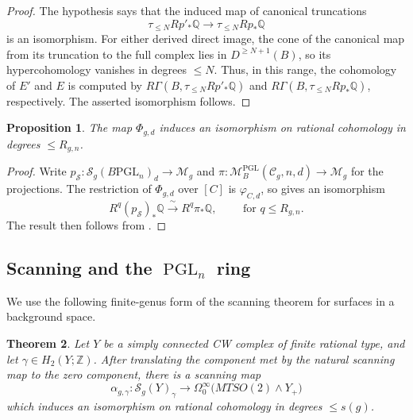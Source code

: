 \documentclass[11pt,reqno]{amsart}
\theoremstyle{plain} %
\newtheorem{theorem}{Theorem}[section]
\newtheorem{prop}[theorem]{Proposition}
\theoremstyle{definition}
\newcommand{\QQ}{\mathbb{Q}}
\newcommand{\M}{\mathcal{M}}
\newcommand{\C}{\mathcal{C}}
\newcommand{\ZZ}{\mathbb{Z}}
\DeclareMathOperator{\PGL}{PGL}
\newcommand{\BPGL}{B\mathrm{PGL}}
\newcommand{\Sc}{\mathcal{S}}
\begin{document}
\begin{proof}
The hypothesis says that the induced map of canonical truncations
\[
\tau_{\le N}Rp'_*\QQ \longrightarrow \tau_{\le N}Rp_*\QQ
\]
is an isomorphism. For either derived direct image, the cone of the canonical map from its truncation to the full complex lies in $D^{\geq N+1}(B)$, so its hypercohomology vanishes in degrees $\le N$. Thus, in this range, the cohomology of $E'$ and $E$ is computed by $R\Gamma(B,\tau_{\le N}Rp'_*\QQ)$ and $R\Gamma(B,\tau_{\le N}Rp_*\QQ)$, respectively. The asserted isomorphism follows.
\end{proof}

\begin{prop} \label{prop: family comparison}
The map $\Phi_{g,d}$ induces an isomorphism on rational cohomology in degrees $\le R_{g,n}$.
\end{prop}

\begin{proof}
Write $p_{\Sc} \colon \Sc_g(\BPGL_n)_d \to \M_g$ and $\pi \colon \M_B^{\PGL}(\C_g,n,d) \to \M_g$ for the projections. The restriction of $\Phi_{g,d}$ over $[C]$ is $\varphi_{C,d}$, so  gives an isomorphism 
\[
R^q(p_{\Sc})_*\QQ \xrightarrow{\ \sim\ } R^q\pi_*\QQ, \qquad \mbox{ for \ } q \le R_{g,n}.
\]
The result then follows from .
\end{proof}

\subsection{Scanning and the $\PGL_n$ ring} \label{subsec: scanning PGL ring}

We use the following finite-genus form of the scanning theorem for surfaces in a background space.

\begin{theorem} \label{thm: scanning}
Let $Y$ be a simply connected CW complex of finite rational type, and let $\gamma \in H_2(Y;\ZZ)$. After translating the component met by the natural scanning map to the zero component, there is a scanning map
\[
\alpha_{g,\gamma} \colon \Sc_g(Y)_\gamma \longrightarrow \Omega^\infty_0\big(MTSO(2) \wedge Y_+\big)
\]
which induces an isomorphism on rational cohomology in degrees $\le s(g)$.
\end{theorem}
\end{document}
